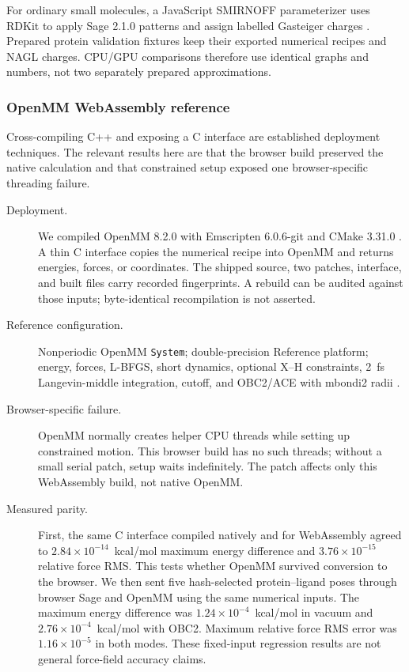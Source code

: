 For ordinary small molecules, a JavaScript SMIRNOFF parameterizer uses RDKit to
apply Sage 2.1.0 patterns and assign labelled Gasteiger charges
\cite{boothroyd2023sage,gasteiger1980charges}. Prepared protein validation fixtures keep
their exported numerical recipes and NAGL charges. CPU/GPU comparisons therefore
use identical graphs and numbers, not two separately prepared approximations.

\subsubsection{OpenMM WebAssembly reference}

Cross-compiling C++ and exposing a C interface are established deployment
techniques. The relevant results here are that the browser build preserved the
native calculation and that constrained setup exposed one browser-specific
threading failure.

\begin{description}
  \item[Deployment.] We compiled OpenMM 8.2.0 with Emscripten 6.0.6-git and
    CMake 3.31.0 \cite{eastman2017openmm,eastman2024openmm8}. A thin C interface
    copies the numerical recipe into OpenMM and returns energies, forces, or
    coordinates. The shipped source, two patches, interface, and built files
    carry recorded fingerprints. A rebuild can be audited against those inputs;
    byte-identical recompilation is not asserted.
  \item[Reference configuration.] Nonperiodic OpenMM \texttt{System};
    double-precision Reference
    platform; energy, forces, L-BFGS, short dynamics, optional X--H constraints,
    2~fs Langevin-middle integration, cutoff, and OBC2/ACE with mbondi2
    radii \cite{onufriev2004obc2}.
  \item[Browser-specific failure.] OpenMM normally creates helper CPU threads while setting
    up constrained motion. This browser build has no such threads; without a
    small serial patch, setup waits indefinitely. The patch affects only this
    WebAssembly build, not native OpenMM.
  \item[Measured parity.] First, the same C interface compiled natively and for
    WebAssembly agreed to $2.84\times10^{-14}$~kcal/mol maximum energy difference
    and $3.76\times10^{-15}$ relative force RMS. This tests whether OpenMM
    survived conversion to the browser. We then sent five hash-selected
    protein--ligand poses
    through browser Sage and OpenMM using the same numerical inputs. The maximum
    energy difference was
    $1.24\times10^{-4}$~kcal/mol in vacuum and
    $2.76\times10^{-4}$~kcal/mol with OBC2. Maximum relative force RMS error was
    $1.16\times10^{-5}$ in both modes. These fixed-input regression results are
    not general force-field accuracy claims.
\end{description}

